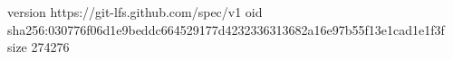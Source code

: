 version https://git-lfs.github.com/spec/v1
oid sha256:030776f06d1e9beddc664529177d4232336313682a16e97b55f13e1cad1e1f3f
size 274276
